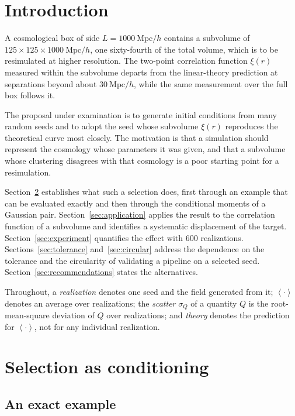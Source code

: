 \documentclass[12pt]{article}
\newcommand{\avg}[1]{\left\langle #1 \right\rangle}
\newcommand{\Mpch}{\ \mathrm{Mpc}/h}
\begin{document}
\tableofcontents

\section{Introduction}\label{sec:intro}

A cosmological box of side $L = 1000\Mpch$ contains a subvolume of
$125 \times 125 \times 1000\Mpch$, one sixty-fourth of the total volume, which
is to be resimulated at higher resolution.  The two-point correlation function
$\xi(r)$ measured within the subvolume departs from the linear-theory
prediction at separations beyond about $30\Mpch$, while the same measurement
over the full box follows it.

The proposal under examination is to generate initial conditions from many
random seeds and to adopt the seed whose subvolume $\xi(r)$ reproduces the
theoretical curve most closely.  The motivation is that a simulation should
represent the cosmology whose parameters it was given, and that a subvolume
whose clustering disagrees with that cosmology is a poor starting point for a
resimulation.

Section~\ref{sec:conditioning} establishes what such a selection does, first
through an example that can be evaluated exactly and then through the
conditional moments of a Gaussian pair.  Section~\ref{sec:application} applies
the result to the correlation function of a subvolume and identifies a
systematic displacement of the target.  Section~\ref{sec:experiment} quantifies
the effect with 600 realizations.  Sections~\ref{sec:tolerance}
and~\ref{sec:circular} address the dependence on the tolerance and the
circularity of validating a pipeline on a selected seed.
Section~\ref{sec:recommendations} states the alternatives.

Throughout, a \emph{realization} denotes one seed and the field generated from
it; $\avg{\cdot}$ denotes an average over realizations; the \emph{scatter}
$\sigma_Q$ of a quantity $Q$ is the root-mean-square deviation of $Q$ over
realizations; and \emph{theory} denotes the prediction for $\avg{\cdot}$, not
for any individual realization.

\section{Selection as conditioning}\label{sec:conditioning}

\subsection{An exact example}\label{sec:dice}
\end{document}
